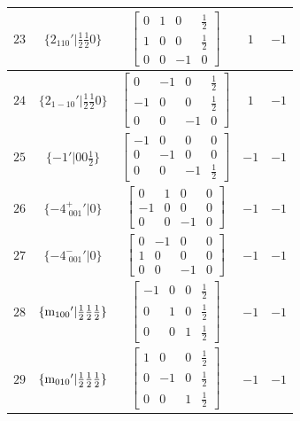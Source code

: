 \documentclass[fleqn,8pt]{jsarticle}
\begin{document}
\begin{longtable}{ccccc}
$ 23 $ & $ \{2{}_{110}{}'|\frac{1}{2} \frac{1}{2} 0\} $ & $ \begin{bmatrix} 0 & 1 & 0 & \frac{1}{2} \\ 1 & 0 & 0 & \frac{1}{2} \\ 0 & 0 & -1 & 0 \end{bmatrix} $ & $ 1 $ & $ -1 $ \\ \hline
$ 24 $ & $ \{2{}_{1-10}{}'|\frac{1}{2} \frac{1}{2} 0\} $ & $ \begin{bmatrix} 0 & -1 & 0 & \frac{1}{2} \\ -1 & 0 & 0 & \frac{1}{2} \\ 0 & 0 & -1 & 0 \end{bmatrix} $ & $ 1 $ & $ -1 $ \\ \hline
$ 25 $ & $ \{-1{}'|0 0 \frac{1}{2}\} $ & $ \begin{bmatrix} -1 & 0 & 0 & 0 \\ 0 & -1 & 0 & 0 \\ 0 & 0 & -1 & \frac{1}{2} \end{bmatrix} $ & $ -1 $ & $ -1 $ \\ \hline
$ 26 $ & $ \{-4^{+}_{\,\,001}{}'|0\} $ & $ \begin{bmatrix} 0 & 1 & 0 & 0 \\ -1 & 0 & 0 & 0 \\ 0 & 0 & -1 & 0 \end{bmatrix} $ & $ -1 $ & $ -1 $ \\ \hline
$ 27 $ & $ \{-4^{-}_{\,\,001}{}'|0\} $ & $ \begin{bmatrix} 0 & -1 & 0 & 0 \\ 1 & 0 & 0 & 0 \\ 0 & 0 & -1 & 0 \end{bmatrix} $ & $ -1 $ & $ -1 $ \\ \hline
$ 28 $ & $ \{{\rm m}_{100}{}'|\frac{1}{2} \frac{1}{2} \frac{1}{2}\} $ & $ \begin{bmatrix} -1 & 0 & 0 & \frac{1}{2} \\ 0 & 1 & 0 & \frac{1}{2} \\ 0 & 0 & 1 & \frac{1}{2} \end{bmatrix} $ & $ -1 $ & $ -1 $ \\ \hline
$ 29 $ & $ \{{\rm m}_{010}{}'|\frac{1}{2} \frac{1}{2} \frac{1}{2}\} $ & $ \begin{bmatrix} 1 & 0 & 0 & \frac{1}{2} \\ 0 & -1 & 0 & \frac{1}{2} \\ 0 & 0 & 1 & \frac{1}{2} \end{bmatrix} $ & $ -1 $ & $ -1 $ \\ \hline

\end{longtable}
\end{document}
